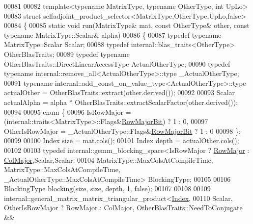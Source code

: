 \begin{DoxyCode}
00081 
00082 \textcolor{keyword}{template}<\textcolor{keyword}{typename} MatrixType, \textcolor{keyword}{typename} OtherType, \textcolor{keywordtype}{int} UpLo>
00083 \textcolor{keyword}{struct }selfadjoint\_product\_selector<MatrixType,OtherType,UpLo,false>
00084 \{
00085   \textcolor{keyword}{static} \textcolor{keywordtype}{void} run(MatrixType& mat, \textcolor{keyword}{const} OtherType& other, \textcolor{keyword}{const} \textcolor{keyword}{typename} MatrixType::Scalar& alpha)
00086   \{
00087     \textcolor{keyword}{typedef} \textcolor{keyword}{typename} MatrixType::Scalar Scalar;
00088     \textcolor{keyword}{typedef} internal::blas\_traits<OtherType> OtherBlasTraits;
00089     \textcolor{keyword}{typedef} \textcolor{keyword}{typename} OtherBlasTraits::DirectLinearAccessType ActualOtherType;
00090     \textcolor{keyword}{typedef} \textcolor{keyword}{typename} internal::remove\_all<ActualOtherType>::type \_ActualOtherType;
00091     \textcolor{keyword}{typename} internal::add\_const\_on\_value\_type<ActualOtherType>::type actualOther = 
      OtherBlasTraits::extract(other.derived());
00092 
00093     Scalar actualAlpha = alpha * OtherBlasTraits::extractScalarFactor(other.derived());
00094 
00095     \textcolor{keyword}{enum} \{
00096       IsRowMajor = (internal::traits<MatrixType>::Flags&\hyperlink{group__flags_gae4f56c2a60bbe4bd2e44c5b19cbe8762}{RowMajorBit}) ? 1 : 0,
00097       OtherIsRowMajor = \_ActualOtherType::Flags&\hyperlink{group__flags_gae4f56c2a60bbe4bd2e44c5b19cbe8762}{RowMajorBit} ? 1 : 0
00098     \};
00099 
00100     Index size = mat.cols();
00101     Index depth = actualOther.cols();
00102 
00103     \textcolor{keyword}{typedef} internal::gemm\_blocking\_space<IsRowMajor ? \hyperlink{group__enums_ggaacded1a18ae58b0f554751f6cdf9eb13acfcde9cd8677c5f7caf6bd603666aae3}{RowMajor} : 
      \hyperlink{group__enums_ggaacded1a18ae58b0f554751f6cdf9eb13a0cbd4bdd0abcfc0224c5fcb5e4f6669a}{ColMajor},Scalar,Scalar,
00104               MatrixType::MaxColsAtCompileTime, MatrixType::MaxColsAtCompileTime, 
      \_ActualOtherType::MaxColsAtCompileTime> BlockingType;
00105 
00106     BlockingType blocking(size, size, depth, 1, \textcolor{keyword}{false});
00107 
00108 
00109     internal::general\_matrix\_matrix\_triangular\_product<\hyperlink{namespace_eigen_a62e77e0933482dafde8fe197d9a2cfde}{Index},
00110       Scalar, OtherIsRowMajor ? \hyperlink{group__enums_ggaacded1a18ae58b0f554751f6cdf9eb13acfcde9cd8677c5f7caf6bd603666aae3}{RowMajor} : \hyperlink{group__enums_ggaacded1a18ae58b0f554751f6cdf9eb13a0cbd4bdd0abcfc0224c5fcb5e4f6669a}{ColMajor},   OtherBlasTraits::NeedToConjugate  &&

\end{DoxyCode}
